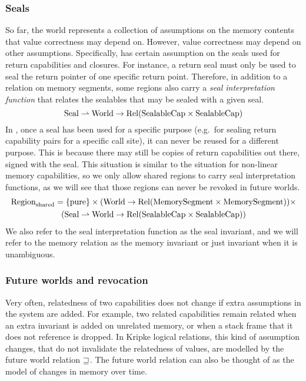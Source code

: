 \begin{jversion}
\subsubsection{Seals}
\label{subsubsec:seals}
So far, the world represents a collection of assumptions on the memory contents that value correctness may depend on.
However, value correctness may depend on other assumptions.
Specifically, \stktokens{} has certain assumption on the seals used for return capabilities and closures.
For instance, a return seal must only be used to seal the return pointer of one specific return point.
Therefore, in addition to a relation on memory segments, some regions also carry a \emph{seal interpretation function} that relates the sealables that may be sealed with a given seal.
  \[
    \mathrm{Seal} \rightharpoonup \mathrm{World} \rightarrow \mathrm{Rel}(\mathrm{SealableCap} \times \mathrm{SealableCap})
  \]
  In \stktokens{}, once a seal has been used for a specific purpose (e.g.\ for sealing return capability pairs for a specific call site), it can never be reused for a different purpose.
  This is because there may still be copies of return capabilities out there, signed with the seal.
  This situation is similar to the situation for non-linear memory capabilities, so we only allow shared regions to carry seal interpretation functions, as we will see that those regions can never be revoked in future worlds.
\begin{multline*}
  \mathrm{Region}_\mathrm{shared} = 
  \{\mathrm{pure} \} \times (\mathrm{World} \rightarrow \mathrm{Rel}(\mathrm{MemorySegment}\times\mathrm{MemorySegment})) \times \\
  (\mathrm{Seal} \rightharpoonup \mathrm{World} \rightarrow \mathrm{Rel}(\mathrm{SealableCap} \times \mathrm{SealableCap}))
\end{multline*}
We also refer to the seal interpretation function as the seal invariant, and we will refer to the memory relation as the memory invariant or just invariant when it is unambiguous.


\subsubsection{Future worlds and revocation}
\label{subsubsec:ft-and-revocation}
Very often, relatedness of two capabilities does not change if extra assumptions in the system are added.
For example, two related capabilities remain related when an extra invariant is added on unrelated memory, or when a stack frame that it does not reference is dropped.
In Kripke logical relations, this kind of assumption changes, that do not invalidate the relatedness of values, are modelled by the future world relation $\sqsupseteq$.
The future world relation can also be thought of as the model of changes in memory over time.


\end{jversion}
